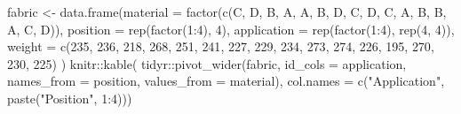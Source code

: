 \documentclass[
]{book}
\newenvironment{Shaded}{\begin{snugshade}}{\end{snugshade}}
\newcommand{\AttributeTok}[1]{\textcolor[rgb]{0.77,0.63,0.00}{#1}}
\newcommand{\DecValTok}[1]{\textcolor[rgb]{0.00,0.00,0.81}{#1}}
\newcommand{\FunctionTok}[1]{\textcolor[rgb]{0.00,0.00,0.00}{#1}}
\newcommand{\NormalTok}[1]{#1}
\newcommand{\OtherTok}[1]{\textcolor[rgb]{0.56,0.35,0.01}{#1}}
\newcommand{\SpecialCharTok}[1]{\textcolor[rgb]{0.00,0.00,0.00}{#1}}
\newcommand{\StringTok}[1]{\textcolor[rgb]{0.31,0.60,0.02}{#1}}
\theoremstyle{definition}
\theoremstyle{definition}
\theoremstyle{definition}
\theoremstyle{definition}
\theoremstyle{remark}
\begin{document}
\begin{enumerate}
\begin{Shaded}
\begin{Highlighting}[]
\NormalTok{fabric }\OtherTok{\textless{}{-}} \FunctionTok{data.frame}\NormalTok{(}\AttributeTok{material =} \FunctionTok{factor}\NormalTok{(}\FunctionTok{c}\NormalTok{(}\StringTok{\textquotesingle{}C\textquotesingle{}}\NormalTok{, }\StringTok{\textquotesingle{}D\textquotesingle{}}\NormalTok{, }\StringTok{\textquotesingle{}B\textquotesingle{}}\NormalTok{, }\StringTok{\textquotesingle{}A\textquotesingle{}}\NormalTok{, }\StringTok{\textquotesingle{}A\textquotesingle{}}\NormalTok{, }\StringTok{\textquotesingle{}B\textquotesingle{}}\NormalTok{, }\StringTok{\textquotesingle{}D\textquotesingle{}}\NormalTok{, }\StringTok{\textquotesingle{}C\textquotesingle{}}\NormalTok{, }
                           \StringTok{\textquotesingle{}D\textquotesingle{}}\NormalTok{, }\StringTok{\textquotesingle{}C\textquotesingle{}}\NormalTok{, }\StringTok{\textquotesingle{}A\textquotesingle{}}\NormalTok{, }\StringTok{\textquotesingle{}B\textquotesingle{}}\NormalTok{, }\StringTok{\textquotesingle{}B\textquotesingle{}}\NormalTok{, }\StringTok{\textquotesingle{}A\textquotesingle{}}\NormalTok{, }\StringTok{\textquotesingle{}C\textquotesingle{}}\NormalTok{, }\StringTok{\textquotesingle{}D\textquotesingle{}}\NormalTok{)),}
               \AttributeTok{position =} \FunctionTok{rep}\NormalTok{(}\FunctionTok{factor}\NormalTok{(}\DecValTok{1}\SpecialCharTok{:}\DecValTok{4}\NormalTok{), }\DecValTok{4}\NormalTok{),}
               \AttributeTok{application =} \FunctionTok{rep}\NormalTok{(}\FunctionTok{factor}\NormalTok{(}\DecValTok{1}\SpecialCharTok{:}\DecValTok{4}\NormalTok{), }\FunctionTok{rep}\NormalTok{(}\DecValTok{4}\NormalTok{, }\DecValTok{4}\NormalTok{)),}
               \AttributeTok{weight =} \FunctionTok{c}\NormalTok{(}\DecValTok{235}\NormalTok{, }\DecValTok{236}\NormalTok{, }\DecValTok{218}\NormalTok{, }\DecValTok{268}\NormalTok{,}
                            \DecValTok{251}\NormalTok{, }\DecValTok{241}\NormalTok{, }\DecValTok{227}\NormalTok{, }\DecValTok{229}\NormalTok{, }
                            \DecValTok{234}\NormalTok{, }\DecValTok{273}\NormalTok{, }\DecValTok{274}\NormalTok{, }\DecValTok{226}\NormalTok{,}
                            \DecValTok{195}\NormalTok{, }\DecValTok{270}\NormalTok{, }\DecValTok{230}\NormalTok{, }\DecValTok{225}\NormalTok{)}
\NormalTok{                 )}
\NormalTok{knitr}\SpecialCharTok{::}\FunctionTok{kable}\NormalTok{(}
\NormalTok{ tidyr}\SpecialCharTok{::}\FunctionTok{pivot\_wider}\NormalTok{(fabric, }\AttributeTok{id\_cols =}\NormalTok{ application, }\AttributeTok{names\_from =}\NormalTok{ position, }
                \AttributeTok{values\_from =}\NormalTok{ material),}
 \AttributeTok{col.names =} \FunctionTok{c}\NormalTok{(}\StringTok{"Application"}\NormalTok{, }\FunctionTok{paste}\NormalTok{(}\StringTok{"Position"}\NormalTok{, }\DecValTok{1}\SpecialCharTok{:}\DecValTok{4}\NormalTok{)))}
\end{Highlighting}
\end{Shaded}


\end{enumerate}
\end{document}
